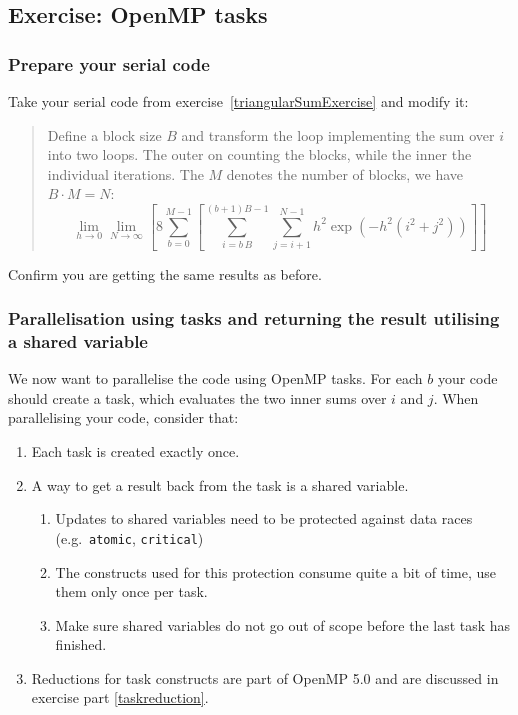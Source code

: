 \subsection{Exercise: OpenMP tasks}


\subsubsection{Prepare your serial code}
Take your serial code from exercise~\ref{triangularSumExercise} and modify it:
\begin{quote}
Define a block size $B$ and transform the loop implementing the sum over $i$ into two loops.  The outer on counting the blocks, while the inner the individual iterations.  The $M$ denotes the number of blocks, we have $B\cdot M= N$:
\begin{equation}
\lim_{h\to0}\lim_{N\to\infty}\left[
8\sum_{b=0}^{M-1}\left[\sum_{i=b\,B}^{(b+1)B-1}\sum_{j=i+1}^{N-1}
h^2 \exp\left(-h^2 (i^2 + j^2)
\right)\right]\right]
\end{equation}
\end{quote}
Confirm you are getting the same results as before.  
\subsubsection{Parallelisation using tasks and returning the result utilising a shared variable}
\label{task_parallel_shared}
We now want to parallelise the code using OpenMP tasks.  For each $b$ your code should create a task, which evaluates the two inner sums over $i$ and $j$. When parallelising your code, consider that:
\begin{enumerate}
\item Each task is created exactly once.
\item A way to get a result back from the task is a shared variable.
\begin{enumerate}
	\item Updates to shared variables need to be protected against data races (e.g.~\verb+atomic+, \verb+critical+)
	\item The constructs used for this protection consume quite a bit of time, use them only once per task.
\item Make sure shared variables do not go out of scope before the last task has finished.	
\end{enumerate}
\item Reductions for task constructs are part of OpenMP 5.0 and are discussed in exercise part \ref{taskreduction}. 
\end{enumerate}
